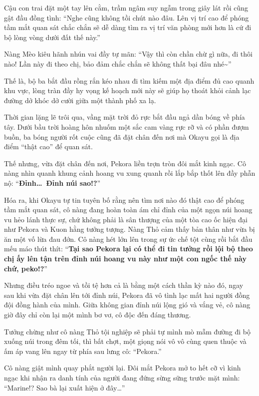 \documentclass[../main.tex]{subfiles}
\begin{document}
Cậu con trai đặt một tay lên cằm, trầm ngâm suy ngẫm trong giây lát rồi cũng gật đầu đồng tình: ``Nghe cũng không tồi chút nào đâu. Lên vị trí cao để phóng tầm mắt quan sát chắc chắn sẽ dễ dàng tìm ra vị trí văn phòng mới hơn là cứ đi bộ lòng vòng dưới đất thế này.''

Nàng Mèo kiêu hãnh nhún vai đầy tự mãn: ``Vậy thì còn chần chừ gì nữa, đi thôi nào! Lần này đi theo chị, bảo đảm chắc chắn sẽ không thất bại đâu nhé\~{}''

Thế là, bộ ba bắt đầu rồng rắn kéo nhau đi tìm kiếm một địa điểm đủ cao quanh khu vực, lòng tràn đầy hy vọng kế hoạch mới này sẽ giúp họ thoát khỏi cảnh lạc đường dở khóc dở cười giữa một thành phố xa lạ.

\ct

Thời gian lặng lẽ trôi qua, vầng mặt trời đỏ rực bắt đầu ngả dần bóng về phía tây. Dưới bầu trời hoàng hôn nhuốm một sắc cam vàng rực rỡ và có phần đượm buồn, ba bóng người rốt cuộc cũng đã đặt chân đến nơi mà Okayu gọi là địa điểm ``thật cao'' để quan sát.

Thế nhưng, vừa đặt chân đến nơi, Pekora liền trợn tròn đôi mắt kinh ngạc. Cô nàng nhìn quanh khung cảnh hoang vu xung quanh rồi lắp bắp thốt lên đầy phẫn nộ: ``\textbf{Đỉnh\dots\ Đỉnh núi sao!?}''

Hóa ra, khi Okayu tự tin tuyên bố rằng nên tìm nơi nào đó thật cao để phóng tầm mắt quan sát, cô nàng đang hoàn toàn ám chỉ đỉnh của một ngọn núi hoang vu hẻo lánh thực sự, chứ không phải là sân thượng của một tòa cao ốc hiện đại như Pekora và Kuon hằng tưởng tượng. Nàng Thỏ cảm thấy bản thân như vừa bị ăn một vố lừa đau đớn. Cô nàng hét lớn lên trong sự ức chế tột cùng rồi bắt đầu mếu máo thút thít: ``\textbf{Tại sao Pekora lại có thể đi tin tưởng rồi lội bộ theo chị ấy lên tận trên đỉnh núi hoang vu này như một con ngốc thế này chứ, peko!?}''


Nhưng điều tréo ngoe và tồi tệ hơn cả là bằng một cách thần kỳ nào đó, ngay sau khi vừa đặt chân lên tới đỉnh núi, Pekora đã vô tình lạc mất hai người đồng đội đồng hành của mình. Giữa không gian đỉnh núi lộng gió và vắng vẻ, cô nàng giờ đây chỉ còn lại một mình bơ vơ, cô độc đến đáng thương.

Tưởng chừng như cô nàng Thỏ tội nghiệp sẽ phải tự mình mò mẫm đường đi bộ xuống núi trong đêm tối, thì bất chợt, một giọng nói vô vô cùng quen thuộc và ấm áp vang lên ngay từ phía sau lưng cô: ``Pekora.''

Cô nàng giật mình quay phắt người lại. Đôi mắt Pekora mở to hết cỡ vì kinh ngạc khi nhận ra danh tính của người đang đứng sừng sững trước mặt mình: ``Marine!? Sao bà lại xuất hiện ở đây\dots''
\end{document}
